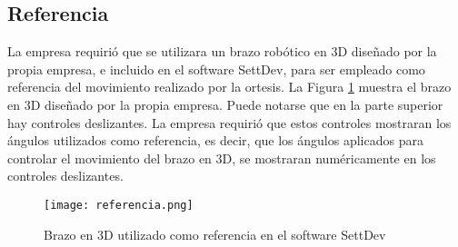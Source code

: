 \subsection{Referencia}

La empresa requirió que se utilizara un brazo robótico en 3D diseñado por la propia empresa, e incluido en el software SettDev, para ser empleado como referencia del movimiento realizado por la ortesis. La Figura \ref{fig:referencia} muestra el brazo en 3D diseñado por la propia empresa. Puede notarse que en la parte superior hay controles deslizantes. La empresa requirió que estos controles mostraran los ángulos utilizados como referencia, es decir, que los ángulos aplicados para controlar el movimiento del brazo en 3D, se mostraran numéricamente en los controles deslizantes.

\begin{figure}[htb]
	\centering
	\texttt{[image: referencia.png]}
	\caption{Brazo en 3D utilizado como referencia en el software SettDev}
	\label{fig:referencia}
\end{figure}
